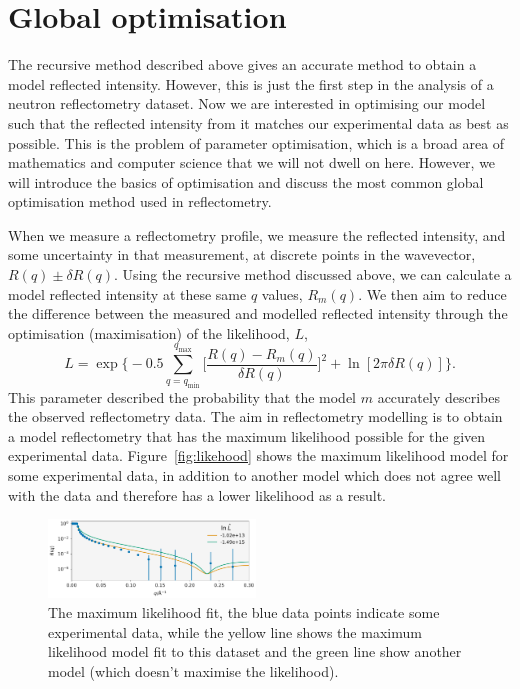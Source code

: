 \documentclass[
 reprint,
 superscriptaddress,
 amsmath,amssymb,
 aps,
]{revtex4-1}
\begin{document}
\section{Global optimisation}
The recursive method described above gives an accurate method to obtain a model reflected intensity. 
However, this is just the first step in the analysis of a neutron reflectometry dataset. 
Now we are interested in optimising our model such that the reflected intensity from it matches our experimental data as best as possible. 
This is the problem of parameter optimisation, which is a broad area of mathematics and computer science that we will not dwell on here. 
However, we will introduce the basics of optimisation and discuss the most common global optimisation method used in reflectometry. 

When we measure a reflectometry profile, we measure the reflected intensity, and some uncertainty in that measurement, at discrete points in the wavevector, $R(q) \pm \delta R(q)$. 
Using the recursive method discussed above, we can calculate a model reflected intensity at these same $q$ values, $R_m(q)$. 
We then aim to reduce the difference between the measured and modelled reflected intensity through the optimisation (maximisation) of the likelihood, $L$, 
%
\begin{equation}
    L = \exp{\bigg\{-0.5 \sum_{q=q_{\text{min}}}^{q_{\text{max}}} \bigg[\frac{R(q) - R_m(q)}{\delta R(q)}\bigg]^2 + \ln[2\pi \delta R(q)]\bigg\}}.
\end{equation}
%
This parameter described the probability that the model $m$ accurately describes the observed reflectometry data. 
The aim in reflectometry modelling is to obtain a model reflectometry that has the maximum likelihood possible for the given experimental data. 
Figure~\ref{fig:likehood} shows the maximum likelihood model for some experimental data, in addition to another model which does not agree well with the data and therefore has a lower likelihood as a result. 
%
\begin{figure}[t]
    \includegraphics[width=0.49\textwidth]{likelihood}
    \caption{The maximum likelihood fit, the blue data points indicate some experimental data, while the yellow line shows the maximum likelihood model fit to this dataset and the green line show another model (which doesn't maximise the likelihood).}
    \label{fig:likelihood}
\end{figure}
%
\end{document}
